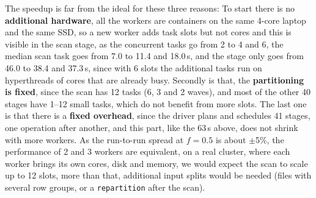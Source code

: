 The speedup is far from the ideal for these three reasons:
To start there is no \textbf{additional hardware}, all the workers are containers on the same 4-core laptop and the same SSD, so a new
worker adds task slots but not cores and this is visible in the scan stage, as the concurrent tasks
go from 2 to 4 and 6, the median scan task goes from 7.0 to 11.4 and 18.0\,s, and the stage only
goes from 46.0 to 38.4 and 37.3\,s, since with 6 slots the additional tasks run on hyperthreads
of cores that are already busy. 
Secondly is that, the \textbf{partitioning is fixed}, since the scan has 12
tasks (6, 3 and 2 waves), and most of the other 40 stages have 1--12 small tasks, which do not
benefit from more slots. The last one is that there is a \textbf{fixed overhead}, since the driver plans and
schedules 41 stages, one operation after another, and this part, like the 63\,s above, does not
shrink with more workers.
As the run-to-run spread at $f=0.5$ is about $\pm$5\%, the performance of 2 and 3 workers
are equivalent, on a real cluster, where each worker brings its own cores, disk and memory, we
would expect the scan to scale up to 12 slots, more than that, additional input splits would be needed
(files with several row groups, or a \texttt{repartition} after the scan).

